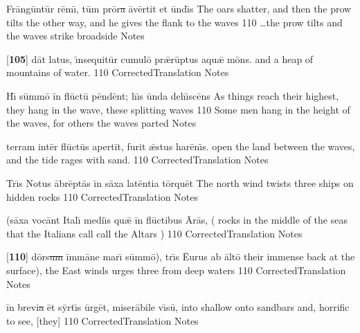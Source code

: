 \latline
  {Fr\=ang\=unt\=ur r\={\macron e}m\={\macron \i}, t\=um pr\={\macron o}r\sout{a }\={\macron a}v\=ert\-it \-et \=und\={\macron \i}s}
  { The oars shatter, and then the prow tilts the other way, and he gives the flank to the waves }
  {110}
  { \ldots the prow tilts and the waves strike broadside }
  { Notes }


\latline
  {[\textbf{105}] d\=at l\-at\-us, \={\macron \i}ns\-equ\-it\=ur c\-um\-ul\={\macron o} pr\={\ae}r\=upt\-us \-aqu\={\ae} m\={\macron o}ns.}
  { and a heap of mountains of water.  }
  {110}
  { CorrectedTranslation }
  { Notes }


\latline
  {H\={\macron \i} s\=umm\={\macron o} \=in fl\={\macron u}ct\={\macron u} p\=end\=ent; h\={\macron \i}s \=und\-a d\-eh\={\macron \i}sc\={\macron e}ns}
  { As things reach their highest, they hang in the wave, these splitting waves }
  {110}
  { Some men hang in the height of the waves, for others the waves parted }
  { Notes }




\latline
  {t\-err\-am \-int\=er fl\={\macron u}ct\={\macron u}s \-ap\-ert\=it, f\-ur\-it \={\ae}st\-us h\-ar\={\macron e}n\={\macron \i}s.}
  { open the land between the waves, and the tide rages with sand. }
  {110}
  { CorrectedTranslation }
  { Notes }


\latline
  {Tr\={\macron \i}s N\-ot\-us \=abr\=ept\={\macron a}s \=in s\=ax\-a l\-at\=ent\-i\-a t\=orqu\=et}
  { The north wind twists three ships on hidden rocks }
  {110}
  { CorrectedTranslation }
  { Notes }


\latline
  {(s\=ax\-a v\-oc\=ant \-It\-al\={\macron \i} m\-edi\={\macron \i}s qu\={\ae} \=in fl\={\macron u}ct\-ib\-us \={\macron A}r\={\macron a}s,}
  { ( rocks in the middle of the seas that the Italians call call the Altars )   }
  {110}
  { CorrectedTranslation }
  { Notes }




\latline
  {[\textbf{110}] d\=ors\sout{um }\=imm\={\macron a}n\-e m\-ar\={\macron \i} s\=umm\={\macron o}), tr\={\macron \i}s \={Eu}r\-us \-ab \=alt\={\macron o}}
  { their immense back at the surface), the East winds urges three from deep waters }
  {110}
  { CorrectedTranslation }
  { Notes }


\latline
  {\=in br\-ev\-i\sout{a }\=et s\=yrt\={\macron \i}s \=urg\=et, m\-is\-er\={\macron a}b\-il\-e v\={\macron \i}s\={\macron u},}
  { into shallow onto sandbars and, horrific to see, [they] }
  {110}
  { CorrectedTranslation }
  { Notes }


